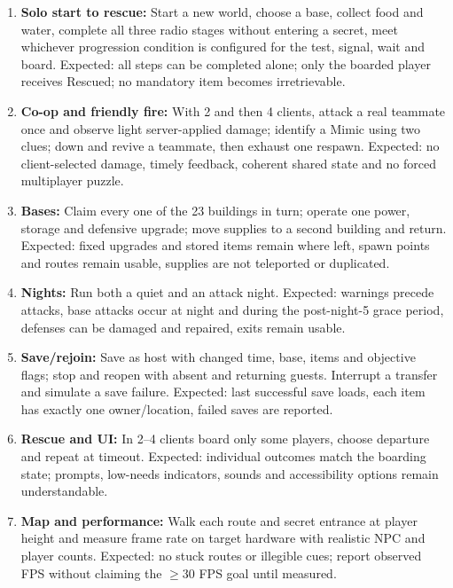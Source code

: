 \begin{enumerate}
\item \textbf{Solo start to rescue:} Start a new world, choose a base, collect food and water, complete all three radio stages without entering a secret, meet whichever progression condition is configured for the test, signal, wait and board. Expected: all steps can be completed alone; only the boarded player receives Rescued; no mandatory item becomes irretrievable.

\item \textbf{Co-op and friendly fire:} With 2 and then 4 clients, attack a real teammate once and observe light server-applied damage; identify a Mimic using two clues; down and revive a teammate, then exhaust one respawn. Expected: no client-selected damage, timely feedback, coherent shared state and no forced multiplayer puzzle.

\item \textbf{Bases:} Claim every one of the 23 buildings in turn; operate one power, storage and defensive upgrade; move supplies to a second building and return. Expected: fixed upgrades and stored items remain where left, spawn points and routes remain usable, supplies are not teleported or duplicated.

\item \textbf{Nights:} Run both a quiet and an attack night. Expected: warnings precede attacks, base attacks occur at night and during the post-night-5 grace period, defenses can be damaged and repaired, exits remain usable.

\item \textbf{Save/rejoin:} Save as host with changed time, base, items and objective flags; stop and reopen with absent and returning guests. Interrupt a transfer and simulate a save failure. Expected: last successful save loads, each item has exactly one owner/location, failed saves are reported.

\item \textbf{Rescue and UI:} In 2--4 clients board only some players, choose departure and repeat at timeout. Expected: individual outcomes match the boarding state; prompts, low-needs indicators, sounds and accessibility options remain understandable.

\item \textbf{Map and performance:} Walk each route and secret entrance at player height and measure frame rate on target hardware with realistic NPC and player counts. Expected: no stuck routes or illegible cues; report observed FPS without claiming the $\geq$30 FPS goal until measured.

\end{enumerate}



